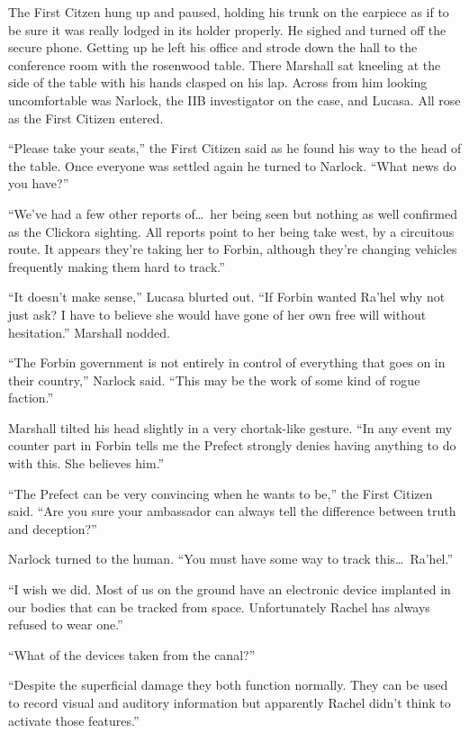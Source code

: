 
The First Citzen hung up and paused, holding his trunk on the earpiece as if to be sure it was
really lodged in its holder properly. He sighed and turned off the secure phone. Getting up he
left his office and strode down the hall to the conference room with the rosenwood table. There
Marshall sat kneeling at the side of the table with his hands clasped on his lap. Across from
him looking uncomfortable was Narlock, the IIB investigator on the case, and Lucasa. All rose as
the First Citizen entered.

``Please take your seats,'' the First Citizen said as he found his way to the head of the table.
Once everyone was settled again he turned to Narlock. ``What news do you have?''

``We've had a few other reports of\ldots\ her being seen but nothing as well confirmed as the
Clickora sighting. All reports point to her being take west, by a circuitous route. It appears
they're taking her to Forbin, although they're changing vehicles frequently making them hard to
track.''

``It doesn't make sense,'' Lucasa blurted out. ``If Forbin wanted Ra'hel why not just ask? I
have to believe she would have gone of her own free will without hesitation.'' Marshall nodded.

``The Forbin government is not entirely in control of everything that goes on in their
country,'' Narlock said. ``This may be the work of some kind of rogue faction.''

Marshall tilted his head slightly in a very chortak-like gesture. ``In any event my counter part
in Forbin tells me the Prefect strongly denies having anything to do with this. She believes
him.''

``The Prefect can be very convincing when he wants to be,'' the First Citizen said. ``Are you
sure your ambassador can always tell the difference between truth and deception?''

Narlock turned to the human. ``You must have some way to track this\ldots\ Ra'hel.''

``I wish we did. Most of us on the ground have an electronic device implanted in our bodies that
can be tracked from space. Unfortunately Rachel has always refused to wear one.''

``What of the devices taken from the canal?''

``Despite the superficial damage they both function normally. They can be used to record visual
and auditory information but apparently Rachel didn't think to activate those features.''

